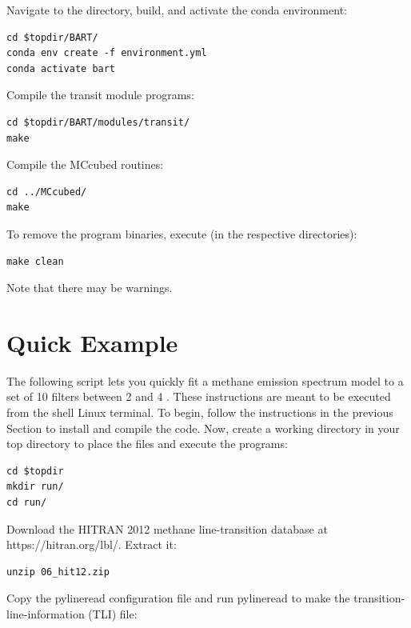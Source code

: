 \documentclass[letterpaper, 12pt]{article}
\begin{document}
\noindent Navigate to the directory, build, and activate the conda environment:
\begin{verbatim}
cd $topdir/BART/
conda env create -f environment.yml
conda activate bart
\end{verbatim}

\noindent Compile the transit module programs:
\begin{verbatim}
cd $topdir/BART/modules/transit/
make
\end{verbatim}

\noindent Compile the {\tttm MCcubed} routines:
\begin{verbatim}
cd ../MCcubed/
make
\end{verbatim}

\noindent To remove the program binaries, execute (in the respective
directories):
\begin{verbatim}
make clean
\end{verbatim}

\noindent Note that there may be warnings. \\

\section{Quick Example}
\label{sec:quick-example}

The following script lets you quickly fit a methane emission spectrum
model to a set of 10 filters between 2 and 4 {\microns}.  These
instructions are meant to be executed from the shell Linux terminal.  To
begin, follow the instructions in the previous Section to install and
compile the code. Now, create a working directory in your top
directory to place the files and execute the programs:

{\fontsize{9.8}{1em}\selectfont 
\begin{verbatim}
cd $topdir
mkdir run/
cd run/
\end{verbatim}}

\noindent Download the HITRAN 2012 methane line-transition database at https://hitran.org/lbl/. Extract it:

{\fontsize{9.8}{1em}\selectfont 
\begin{lstlisting}[breaklines]
unzip 06_hit12.zip
\end{lstlisting}}


\noindent Copy the pylineread configuration file and run pylineread to
make the transition-line-information (TLI) file:
\end{document}
